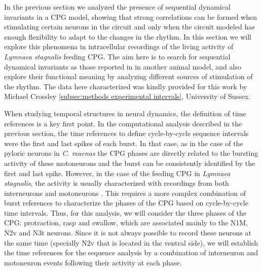 In the previous section we analyzed the presence of sequential dynamical invariants in a CPG model, showing that strong correlations can be formed when stimulating certain neurons in the circuit and only when the circuit modeled has enough flexibility to adapt to the changes in the rhythm. In this section we will explore this phenomena in intracellular recordings of the living activity of \textit{Lymnaea stagnalis} feeding CPG. The aim here is to search for sequential dynamical invariants as those reported in \textcite{elices_robust_2019} in another animal model, and also explore their functional meaning by analyzing different sources of stimulation of the rhythm. The data here characterized was kindly provided for this work by Michael Crossley \ref{subsec:methods experimental intervals}, University of Sussex.

When studying temporal structures in neural dynamics, the definition of time references is a key first point. In the computational analysis described in the previous section, the time references to define cycle-by-cycle sequence intervals were the first and last spikes of each burst. In that case, as in the case of the pyloric neurons in \textit{C. maenas} the CPG phases are directly related to the bursting activity of these motoneurons and the burst can be consistently identified by the first and last spike. However, in the case of the feeding CPG in \textit{Lymnaea stagnalis}, the activity is usually characterized with recordings from both interneurons and motoneurons \parencite{elliott_interactions_1985, staras_pattern-generating_1998, benjamin_distributed_2012}. This requires a more complex combination of burst references to characterize the phases of the CPG based on cycle-by-cycle time intervals. Thus, for this analysis, we will consider the three phases of the CPG: protraction, rasp and swallow, which are associated mainly to the N1M, N2v and N3t neurons. Since it is not always possible to record these neurons at the same time (specially N2v that is located in the ventral side), we will establish the time references for the sequence analysis by a combination of interneuron and motoneuron events following their activity at each phase. 

